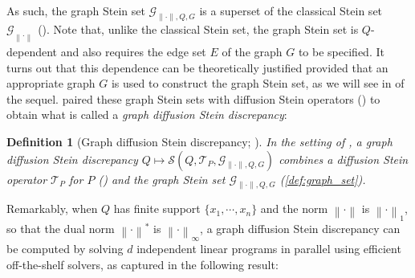 \documentclass[12pt,paper=letter]{scrreprt}
\newtheorem{definition}{Definition}[chapter]
\def\norm#1{\left\|{#1}\right\|} %
\newcommand{\gset}[0]{\mathcal{G}} %
\newcommand{\steinset}[0]{\steinsetarg{}} %
\newcommand{\steinsetarg}[1]{\gset_{\norm{\cdot}_{#1}}} %
\begin{document}
\noindent As such, the graph Stein set $\mathcal{G}_{\|\cdot\|,Q,G}$ is a superset of the classical Stein set $\steinset$ ().
Note that, unlike the classical Stein set, the graph Stein set is $Q$-dependent and also requires the edge set $E$ of the graph $G$ to be specified.
It turns out that this dependence can be theoretically justified provided that an appropriate graph $G$ is used to construct the graph Stein set, as we will see in  of the sequel.
\citet{gorham2015measuring,Gorham2019} paired these graph Stein sets with diffusion Stein operators () to obtain what is called a \emph{graph diffusion Stein discrepancy}:

\begin{definition}[Graph diffusion Stein discrepancy; \citealp{Gorham2019}]\label{def:graph_diffusion_sd}
In the setting of , a \emph{graph diffusion Stein discrepancy} $Q \mapsto \mathcal{S}(Q,\mathcal{T}_P,\mathcal{G}_{\|\cdot\|,Q,G})$ combines a diffusion Stein operator $\mathcal{T}_P$ for $P$ () and the graph Stein set $\mathcal{G}_{\|\cdot\|,Q,G}$ (\cref{def:graph_set}).
\end{definition}

Remarkably, when $Q$ has finite support $\{x_1, \cdots, x_n\}$ and the norm $\norm{\cdot}$ is $\norm{\cdot}_1$, so that the dual norm $\norm{\cdot}^*$ is $\norm{\cdot}_\infty$, a graph diffusion Stein discrepancy can be computed by solving $d$ independent linear programs in parallel using efficient off-the-shelf solvers, as captured in the following result:
\end{document}
